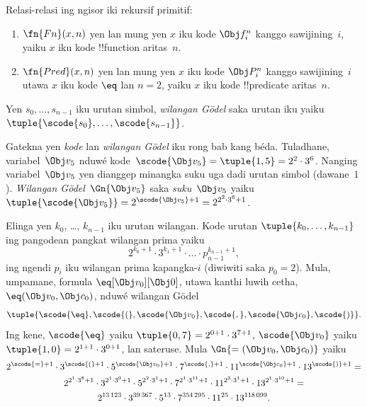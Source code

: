 \documentclass[../../../include/open-logic-section]{subfiles}
\begin{document}
\begin{prop}
Relasi-relasi ing ngisor iki rekursif primitif:
\begin{enumerate}
\item $\fn{Fn}(x, n)$ yen lan mung yen $x$
  iku kode $\Obj f^n_i$ kanggo sawijining~$i$,
  yaiku $x$ iku kode !!{function} aritas~$n$.
\item $\fn{Pred}(x, n)$ yen lan mung yen $x$
  iku kode $\Obj P^n_i$ kanggo sawijining~$i$
  utawa $x$ iku kode $\eq$ lan $n = 2$,
  yaiku $x$ iku kode !!{predicate} aritas~$n$.
\end{enumerate}
\end{prop}

\begin{defn}
Yen $s_0, \dots, s_{n-1}$ iku urutan simbol,
\emph{wilangan G\"odel} saka urutan iku yaiku
$\tuple{\scode{s_0}, \dots, \scode{s_{n-1}}}$.
\end{defn}

\begin{explain}
Gatekna yen \emph{kode} lan \emph{wilangan G\"odel}
iku rong bab kang béda. Tuladhane,
variabel~$\Obj v_5$ nduwé kode~$\scode{\Obj
  v_5} = \tuple{1, 5} = 2^2\cdot 3^6$.
Nanging variabel~$\Obj v_5$ yen dianggep
minangka suku uga dadi urutan simbol
(dawane~$1$). \emph{Wilangan G\"odel}~$\Gn{\Obj v_5}$
saka \emph{suku}~$\Obj v_5$ yaiku
$\tuple{\scode{\Obj v_5}} = 2^{\scode{\Obj
    v_5} + 1} = 2^{2^2\cdot 3^6 + 1}$.
\end{explain}

\begin{ex}
Elinga yen $k_0$, \dots, $k_{n-1}$ iku
urutan wilangan. Kode urutan
$\tuple{k_0, \dots, k_{n-1}}$ ing
pangodean pangkat wilangan prima yaiku
\[
2^{k_0+1}\cdot3^{k_1+1}\cdot \dots \cdot p_{n-1}^{k_{n-1}+1},
\]
ing ngendi $p_i$ iku wilangan prima kapangka-$i$
(diwiwiti saka $p_0 = 2$). Mula, umpamane,
formula $\eq[\Obj v_0][\Obj 0]$, utawa
kanthi luwih cetha, ${\eq}(\Obj v_0,\Obj c_0)$,
nduwé wilangan G\"odel
\[
\tuple{\scode{\eq},\scode{(},\scode{\Obj v_0},\scode{,}, \scode{\Obj
    c_0},\scode{)}}.
\]
Ing kene, $\scode{\eq}$ yaiku
$\tuple{0,7} = 2^{0+1}\cdot 3^{7+1}$,
$\scode{\Obj v_0}$ yaiku
$\tuple{1,0} = 2^{1+1}\cdot3^{0+1}$,
lan sateruse. Mula $\Gn{=(\Obj v_0,\Obj c_0)}$ yaiku
\begin{multline*}
2^{\scode{=} + 1}\cdot 3^{\scode{(}+1}\cdot 5^{\scode{\Obj v_0}+1}
\cdot 7^{\scode{,} + 1} \cdot 11^{\scode{\Obj c_0}+1} \cdot
13^{\scode{)}+1} = \\
2^{2^1\cdot 3^8 + 1}\cdot 3^{2^1\cdot 3^9+1}\cdot 5^{2^2\cdot 3^1+1}
\cdot 7^{2^1\cdot 3^{11} + 1} \cdot 11^{2^3\cdot3^1+1} \cdot
13^{2^1\cdot3^{10}+1} = \\
2^{13\,123}\cdot 3^{39\,367}\cdot 5^{13}\cdot 7^{354\,295}\cdot11^{25}\cdot13^{118\,099}.
\end{multline*}
\end{ex}
\end{document}
